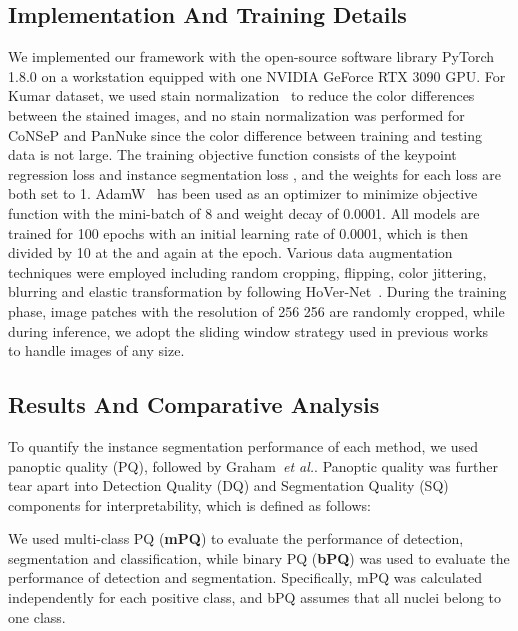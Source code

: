 \documentclass[lettersize,journal]{IEEEtran}
\newcommand{\etal}{{\textit{et al.}}}
\begin{document}
\subsection{Implementation And Training Details}
We implemented our framework with the open-source software library PyTorch 1.8.0 on a workstation equipped with one NVIDIA GeForce RTX 3090 GPU. For Kumar dataset, we used stain normalization~\cite{stainnorm} to reduce the color differences between the stained images, and no stain normalization was performed for CoNSeP and PanNuke since the color difference between training and testing data is not large. The training objective function consists of the keypoint regression loss  and instance segmentation loss , and the weights for each loss are both set to 1. AdamW~\cite{adamw} has been used as an optimizer to minimize objective function with the mini-batch of 8 and weight decay of 0.0001. All models are trained for 100 epochs with an initial learning rate of 0.0001, which is then divided by 10 at the  and again at the  epoch. Various data augmentation techniques were employed including random cropping, flipping, color jittering, blurring and elastic transformation by following HoVer-Net~\cite{hovernet}. During the training phase, image patches with the resolution of 256  256 are randomly cropped, while during inference, we adopt the sliding window strategy used in previous works~\cite{dist,cianet,hovernet} to handle images of any size.

\subsection{Results And Comparative Analysis}
To quantify the instance segmentation performance of each method, we used panoptic quality (PQ), followed by Graham~\etal\cite{hovernet}. Panoptic quality was further tear apart into Detection Quality (DQ) and Segmentation Quality (SQ) components for interpretability, which is defined as follows:

We used multi-class PQ (\textbf{mPQ}) to evaluate the performance of detection, segmentation and classification, while binary PQ (\textbf{bPQ}) was used to evaluate the performance of detection and segmentation. Specifically, mPQ was calculated independently for each positive class, and bPQ assumes that all nuclei belong to one class.
\end{document}
